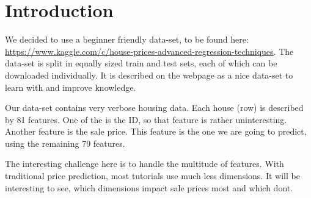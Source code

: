 \section{Introduction}

We decided to use a beginner friendly data-set, to be found here: \url{https://www.kaggle.com/c/house-prices-advanced-regression-techniques}. The data-set is split in equally sized train and test sets, each of which can be downloaded individually. It is described on the webpage as a nice data-set to learn with and improve knowledge.

Our data-set contains very verbose housing data. Each house (row) is described by 81 features. One of the is the ID, so that feature is rather uninteresting. Another feature is the sale price. This feature is the one we are going to predict, using the remaining 79 features.

The interesting challenge here is to handle the multitude of features. With traditional price prediction, most tutorials use much less dimensions. It will be interesting to see, which dimensions impact sale prices most and which dont.